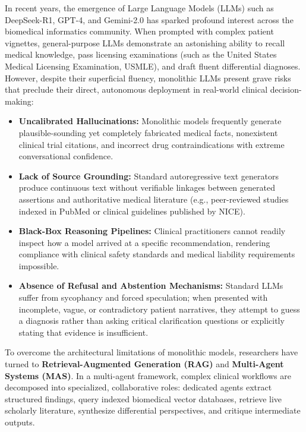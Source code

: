 \documentclass[12pt,a4paper]{report}
\begin{document}
In recent years, the emergence of Large Language Models (LLMs) such as DeepSeek-R1, GPT-4, and Gemini-2.0 has sparked profound interest across the biomedical informatics community. When prompted with complex patient vignettes, general-purpose LLMs demonstrate an astonishing ability to recall medical knowledge, pass licensing examinations (such as the United States Medical Licensing Examination, USMLE), and draft fluent differential diagnoses. However, despite their superficial fluency, monolithic LLMs present grave risks that preclude their direct, autonomous deployment in real-world clinical decision-making:
\begin{itemize}
    \item \textbf{Uncalibrated Hallucinations:} Monolithic models frequently generate plausible-sounding yet completely fabricated medical facts, nonexistent clinical trial citations, and incorrect drug contraindications with extreme conversational confidence.
    \item \textbf{Lack of Source Grounding:} Standard autoregressive text generators produce continuous text without verifiable linkages between generated assertions and authoritative medical literature (e.g., peer-reviewed studies indexed in PubMed or clinical guidelines published by NICE).
    \item \textbf{Black-Box Reasoning Pipelines:} Clinical practitioners cannot readily inspect how a model arrived at a specific recommendation, rendering compliance with clinical safety standards and medical liability requirements impossible.
    \item \textbf{Absence of Refusal and Abstention Mechanisms:} Standard LLMs suffer from sycophancy and forced speculation; when presented with incomplete, vague, or contradictory patient narratives, they attempt to guess a diagnosis rather than asking critical clarification questions or explicitly stating that evidence is insufficient.
\end{itemize}

To overcome the architectural limitations of monolithic models, researchers have turned to \textbf{Retrieval-Augmented Generation (RAG)} and \textbf{Multi-Agent Systems (MAS)}. In a multi-agent framework, complex clinical workflows are decomposed into specialized, collaborative roles: dedicated agents extract structured findings, query indexed biomedical vector databases, retrieve live scholarly literature, synthesize differential perspectives, and critique intermediate outputs. 
\end{document}
